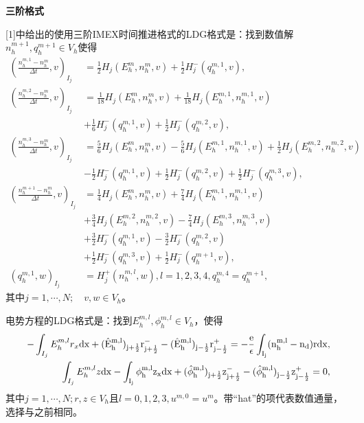 \noindent \textbf{三阶格式}

[1]中给出的使用三阶IMEX时间推进格式的LDG格式是：找到数值解$n_h^{m+1},q_h^{m+1} \in V_h$使得
\begin{align}
    (\frac{n_h^{m,1} -n_h^m}{\Delta t},v)_{I_j} & =\frac{1}{2} H_j(E_h^m,n_h^m,v) + \frac{1}{2} H_j^-(q_h^{m,1},v),           \label{weakForm:IMEX3 LDG 1}                   \\
    (\frac{n_h^{m,2} -n_h^m}{\Delta t},v)_{I_j} & = \frac{1}{18} H_j(E_h^m,n_h^m,v) + \frac{1}{18} H_j(E_h^{m,1},n_h^{m,1},v) \nonumber                                      \\
                                                & + \frac{1}{6} H_j^-(q_h^{m,1},v) + \frac{1}{2} H_j^-(q_h^{m,2},v),                                                         \\
    (\frac{n_h^{m,3} -n_h^m}{\Delta t},v)_{I_j} & =\frac{5}{6} H_j(E_h^m,n_h^m,v) -\frac{5}{6} H_j(E_h^{m,1},n_h^{m,1},v) + \frac{1}{2} H_j(E_h^{m,2},n_h^{m,2},v) \nonumber \\
                                                & - \frac{1}{2} H_j^-(q_h^{m,1},v) + \frac{1}{2} H_j^-(q_h^{m,2},v) + \frac{1}{2} H_j^-(q_h^{m,3},v),                        \\
    (\frac{n_h^{m+1} -n_h^m}{\Delta t},v)_{I_j} & = \frac{1}{4} H_j(E_h^m,n_h^m,v) +\frac{7}{4} H_j(E_h^{m,1},n_h^{m,1},v)  \nonumber                                        \\
                                                & + \frac{3}{4} H_j(E_h^{m,2},n_h^{m,2},v) - \frac{7}{4} H_j(E_h^{m,3},n_h^{m,3},v) \nonumber                                \\
                                                & +\frac{3}{2} H_j^-(q_h^{m,1},v) -\frac{3}{2} H_j^-(q_h^{m,2},v) \nonumber                                                  \\
                                                & + \frac{1}{2} H_j^-(q_h^{m,3},v)  + \frac{1}{2} H_j^-(q_h^{m+1},v),                                                        \\
    (q_h^{m,1},w)_{I_j}                         & = H_j^+(n_h^{m,l},w), l = 1,2,3,4, q_h^{m,4} = q_h^{m+1},
\end{align}
其中$j = 1,\cdots,N;\quad v,w \in V_h$。

电势方程的LDG格式是：找到$E_h^{m,l},\phi_h^{m,l} \in V_h$，使得
\begin{align}
    -\int_{I_j} E_h^{m,l}r_x \rm{d}x + (\hat{E}_h^{m,l})_{j+\frac{1}{2}}r_{j+\frac{1}{2}}^- - (\hat{E}_h^{m,l})_{j-\frac{1}{2}}r_{j-\frac{1}{2}}^+ = -\frac{e}{\epsilon}\int_{I_j}(n_h^{m,l} - n_d) r\rm{d} x, \\
    \int_{I_j} E_h^{m,l}z \rm{d}x - \int_{I_j} \phi_h^{m,l}z_x \rm{d}x  + (\hat{\phi}_h^{m,l})_{j+\frac{1}{2}}z^-_{j+\frac{1}{2}} - (\hat{\phi}_h^{m,l})_{j-\frac{1}{2}}z_{j-\frac{1}{2}}^+  = 0,\label{equation:IMEX3 LDG:EPE 2}
\end{align}
其中$j = 1,\cdots,N; r,z \in V_h$且$l = 0,1,2,3, u^{m,0} = u^m$。带“hat”的项代表数值通量，选择与之前相同。

